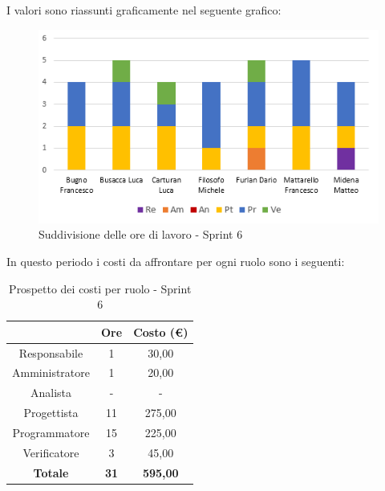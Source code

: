 I valori sono riassunti graficamente nel seguente grafico:

\begin{figure}[H]
  \centering
  \includegraphics[scale=1.0]{immagini/5Sprint_oreLavoro.png}
  \caption{Suddivisione delle ore di lavoro - Sprint 6}
\end{figure}

\pagebreak
In questo periodo i costi da affrontare per ogni ruolo sono i seguenti:

\begin{table}[H]
  \centering
  \renewcommand{\arraystretch}{1.8}
  \begin{tabular}{c|c|c}
    \rowcolor[HTML]{125E28}
    \multicolumn{1}{c}{\color[HTML]{FFFFFF}\textbf{Ruolo}}
                    & \multicolumn{1}{c}{\color[HTML]{FFFFFF}\textbf{Ore}}
                    & \multicolumn{1}{c}{\color[HTML]{FFFFFF}\textbf{Costo (€)}}                   \\
    \hline
    Responsabile    & 1                                                          & 30,00           \\
    Amministratore  & 1                                                          & 20,00           \\
    Analista        & -                                                          & -               \\
    Progettista     & 11                                                         & 275,00          \\
    Programmatore   & 15                                                         & 225,00          \\
    Verificatore    & 3                                                          & 45,00           \\
    \textbf{Totale} & \textbf{31}                                                & \textbf{595,00}
  \end{tabular}
  \caption{Prospetto dei costi per ruolo - Sprint 6}
\end{table}

